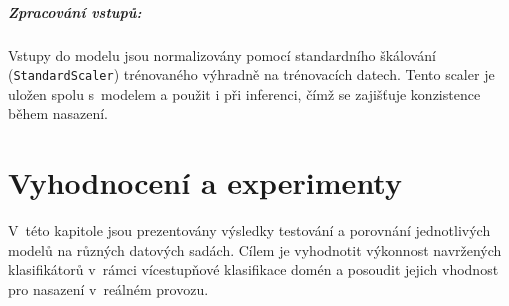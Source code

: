 \paragraph{Zpracování vstupů:} Vstupy do modelu jsou normalizovány pomocí standardního škálování (\texttt{StandardScaler}) trénovaného výhradně na trénovacích datech. Tento scaler je uložen spolu s~modelem a použit i při inferenci, čímž se zajišťuje konzistence během nasazení.














\chapter{Vyhodnocení a experimenty}
\label{experiments:eval}\label{chapter:9}

V~této kapitole jsou prezentovány výsledky testování a porovnání jednotlivých modelů na různých datových sadách. Cílem je vyhodnotit výkonnost navržených klasifikátorů v~rámci vícestupňové klasifikace domén a posoudit jejich vhodnost pro nasazení v~reálném provozu. 

